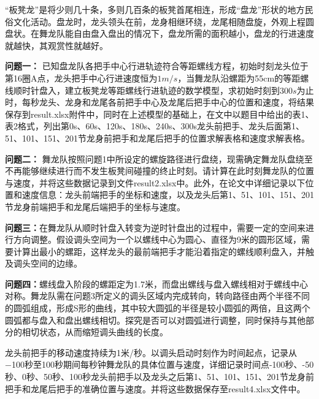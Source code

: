 \setcounter{page}{1}


\quad “板凳龙”是将少则几十条，多则几百条的板凳首尾相连，形成“盘龙”形状的地方民俗文化活动。盘龙时，龙头领头在前，龙身相继环绕，龙尾相随盘旋，外观上程圆盘状。在舞龙队能自由盘入盘出的情况下，盘龙所需的面积越小，盘龙的行进速度就越快，其观赏性就越好。



\textbf {问题一：}
已知盘龙队各把手中心行进轨迹符合等距螺线方程，初始时刻龙头位于第16圈A点，龙头把手中心行进速度恒为$1m/s$，当舞龙队沿螺距为55cm的等距螺线顺时针盘入，建立板凳龙等距螺线行进轨迹的数学模型，求初始时刻到$300s$为止时，每秒龙头、龙身和龙尾各前把手中心及龙尾后把手中心的位置和速度，将结果保存到result.xlsx附件中，同时在上述模型的基础上，在文中以题目中给出的表1、表2格式，列出第0s、60s、120s、180s、240s、300s龙头前把手、龙头后面第1、51、101、151、201节龙身前把手和龙尾后把手的位置求解表格和速度求解表格。

\textbf {问题二：}
舞龙队按照问题1中所设定的螺旋路径进行盘绕，现需确定舞龙队盘绕至不再能够继续进行而不发生板凳间碰撞的终止时刻。请计算在此时刻舞龙队的位置与速度，并将这些数据记录到文件result2.xlsx中。此外，在论文中详细记录以下位置和速度信息：龙头前端把手的坐标和速度，以及龙头后第1、51、101、151、201节龙身前端把手和龙尾后端把手的坐标与速度。



\textbf {问题三：}在舞龙队从顺时针盘入转变为逆时针盘出的过程中，需要一定的空间来进行方向调整。假设调头空间为一个以螺线中心为圆心、直径为9米的圆形区域，需要计算出最小的螺距，这样龙头的最前端把手才能沿着指定的螺线顺利盘入，并触及调头空间的边缘。


\textbf {问题四：}螺线盘入阶段的螺距定为1.7米，而盘出螺线与盘入螺线相对于螺线中心对称。舞龙队需在问题3所定义的调头区域内完成转向，转向路径由两个半径不同的圆弧组成，形成S形的曲线，其中较大圆弧的半径是较小圆弧的两倍，且这两个圆弧都与盘入和盘出螺线相切。探究是否可以对圆弧进行调整，同时保持与其他部分的相切状态，从而缩短调头曲线的长度。

龙头前把手的移动速度持续为1米/秒。以调头启动时刻作为时间起点，记录从−100秒至100秒期间每秒钟舞龙队的具体位置与速度，详细记录时间点-100秒、-50秒、0秒、50秒、100秒龙头前把手以及龙头之后第1、51、101、151、201节龙身前把手和龙尾后把手的准确位置与速度。并将这些数据保存至result4.xlsx文件中。



